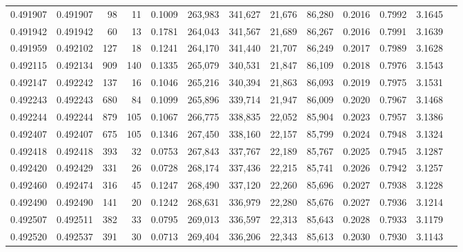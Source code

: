 \begin{tabular}{rrrrrrrrrrrrr}
0.491907 & 0.491907 &    98 &    11 &                                     0.1009 & 263,983 & 341,627 &  21,676 &  86,280 & 0.2016 & 0.7992 & 3.1645 \\
0.491942 & 0.491942 &    60 &    13 &                                     0.1781 & 264,043 & 341,567 &  21,689 &  86,267 & 0.2016 & 0.7991 & 3.1639 \\
0.491959 & 0.492102 &   127 &    18 &                                     0.1241 & 264,170 & 341,440 &  21,707 &  86,249 & 0.2017 & 0.7989 & 3.1628 \\
0.492115 & 0.492134 &   909 &   140 &                                     0.1335 & 265,079 & 340,531 &  21,847 &  86,109 & 0.2018 & 0.7976 & 3.1543 \\
0.492147 & 0.492242 &   137 &    16 &                                     0.1046 & 265,216 & 340,394 &  21,863 &  86,093 & 0.2019 & 0.7975 & 3.1531 \\
0.492243 & 0.492243 &   680 &    84 &                                     0.1099 & 265,896 & 339,714 &  21,947 &  86,009 & 0.2020 & 0.7967 & 3.1468 \\
0.492244 & 0.492244 &   879 &   105 &                                     0.1067 & 266,775 & 338,835 &  22,052 &  85,904 & 0.2023 & 0.7957 & 3.1386 \\
0.492407 & 0.492407 &   675 &   105 &                                     0.1346 & 267,450 & 338,160 &  22,157 &  85,799 & 0.2024 & 0.7948 & 3.1324 \\
0.492418 & 0.492418 &   393 &    32 &                                     0.0753 & 267,843 & 337,767 &  22,189 &  85,767 & 0.2025 & 0.7945 & 3.1287 \\
0.492420 & 0.492429 &   331 &    26 &                                     0.0728 & 268,174 & 337,436 &  22,215 &  85,741 & 0.2026 & 0.7942 & 3.1257 \\
0.492460 & 0.492474 &   316 &    45 &                                     0.1247 & 268,490 & 337,120 &  22,260 &  85,696 & 0.2027 & 0.7938 & 3.1228 \\
0.492490 & 0.492490 &   141 &    20 &                                     0.1242 & 268,631 & 336,979 &  22,280 &  85,676 & 0.2027 & 0.7936 & 3.1214 \\
0.492507 & 0.492511 &   382 &    33 &                                     0.0795 & 269,013 & 336,597 &  22,313 &  85,643 & 0.2028 & 0.7933 & 3.1179 \\
0.492520 & 0.492537 &   391 &    30 &                                     0.0713 & 269,404 & 336,206 &  22,343 &  85,613 & 0.2030 & 0.7930 & 3.1143 \\

\end{tabular}
